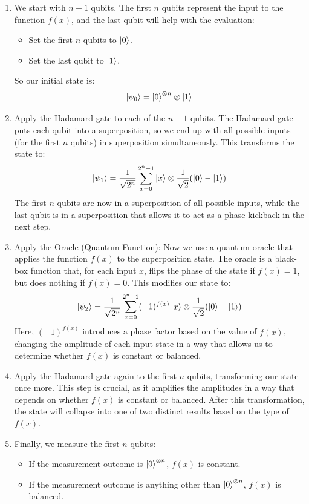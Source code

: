 \documentclass{article}
\begin{document}
		\begin{enumerate}
			\item We start with \( n + 1 \) qubits. The first \( n \) qubits represent the input to the function \( f(x) \), and the last qubit will help with the evaluation:
			\begin{itemize}
				\item Set the first \( n \) qubits to \( \ket{0} \).
				\item Set the last qubit to \( \ket{1} \).
			\end{itemize}
			So our initial state is:
			\[
			\ket{\psi_0} = \ket{0}^{\otimes n} \otimes \ket{1}
			\]
		
			\item Apply the Hadamard gate to each of the \( n + 1 \) qubits. The Hadamard gate puts each qubit into a superposition, so we end up with all possible inputs (for the first \( n \) qubits) in superposition simultaneously. This transforms the state to:
			\[
			\ket{\psi_1} = \frac{1}{\sqrt{2^n}} \sum_{x=0}^{2^n - 1} \ket{x} \otimes \frac{1}{\sqrt{2}}(\ket{0} - \ket{1})
			\]
			The first \( n \) qubits are now in a superposition of all possible inputs, while the last qubit is in a superposition that allows it to act as a phase kickback in the next step.
		
			\item Apply the Oracle (Quantum Function): Now we use a quantum oracle that applies the function \( f(x) \) to the superposition state. The oracle is a black-box function that, for each input \( x \), flips the phase of the state if \( f(x) = 1 \), but does nothing if \( f(x) = 0 \). This modifies our state to:
			\[
			\ket{\psi_2} = \frac{1}{\sqrt{2^n}} \sum_{x=0}^{2^n - 1} (-1)^{f(x)} \ket{x} \otimes \frac{1}{\sqrt{2}} (\ket{0} - \ket{1})
			\]
			Here, \( (-1)^{f(x)} \) introduces a phase factor based on the value of \( f(x) \), changing the amplitude of each input state in a way that allows us to determine whether \( f(x) \) is constant or balanced.
		
			\item Apply the Hadamard gate again to the first \( n \) qubits, transforming our state once more. This step is crucial, as it amplifies the amplitudes in a way that depends on whether \( f(x) \) is constant or balanced. After this transformation, the state will collapse into one of two distinct results based on the type of \( f(x) \).
		
			\item Finally, we measure the first \( n \) qubits:
			\begin{itemize}
				\item If the measurement outcome is \( \ket{0}^{\otimes n} \), \( f(x) \) is constant.
				\item If the measurement outcome is anything other than \( \ket{0}^{\otimes n} \), \( f(x) \) is balanced.
			\end{itemize}
		\end{enumerate}
		
\end{document}
